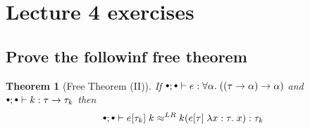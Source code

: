 \documentclass[a4paper,10pt,fleqn]{article}
\newcommand{\mtenv}{{\raisebox{1.5pt}{$\scriptstyle\bullet$}}}
\newcommand{\tlabs}[3]{\ensuremath{\lambda #1 : #2 . \; #3}}
\newcommand{\tarrow}[2]{\ensuremath{ #1 \rightarrow #2}}
\newcommand{\equivalence}[3]{\ensuremath{#1 \approx^{#2} #3}}
\newcommand{\lreq}[2]{\equivalence{#1}{LR}{#2}}
\newtheorem*{theorem}{Theorem}
\begin{document}
\section*{Lecture 4 exercises}
\subsection*{Prove the followinf free theorem}  
\begin{theorem}[Free Theorem (II)]
    If $\mtenv; \mtenv \vdash e : \forall \alpha. \; (\tarrow{(\tarrow{\tau}{\alpha})}{\alpha})$ and 
       $\mtenv; \mtenv \vdash k : \tarrow{\tau}{\tau_k}$ then
    \[
      \mtenv; \mtenv \vdash \lreq{e[\tau_k] \; k}{k(e[\tau] \; \tlabs{x}{\tau}{x})} : \tau_k
    \]
  \end{theorem}
\end{document}
